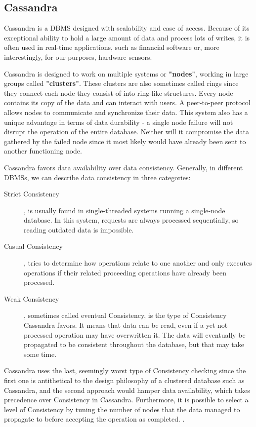\subsection{Cassandra}
\label{subsec:background:second_section:first_subsection}
\par Cassandra is a DBMS designed with scalability and ease of access. Because of its exceptional ability to hold a large amount of data and process lots of writes, it is often used in real-time applications, such as financial software or, more interestingly, for our purposes, hardware sensors\citep{CassandraUseCase}. 
\par Cassandra is designed to work on multiple systems or \textbf{"nodes"}, working in large groups called \textbf{"clusters"}. These clusters are also sometimes called rings since they connect each node they consist of into ring-like structures. Every node contains its copy of the data and can interact with users. A peer-to-peer protocol allows nodes to communicate and synchronize their data. This system also has a unique advantage in terms of data durability - a single node failure will not disrupt the operation of the entire database. Neither will it compromise the data gathered by the failed node since it most likely would have already been sent to another functioning node\citep{HewittCassandra}.
\par Cassandra favors data availability over data consistency. Generally, in different DBMSs, we can describe data consistency in three categories:
\begin{description}
  \item [Strict Consistency], is usually found in single-threaded systems running a single-node database. In this system, requests are always processed sequentially, so reading outdated data is impossible.
  \item [Casual Consistency], tries to determine how operations relate to one another and only executes operations if their related proceeding operations have already been processed.
  \item [Weak Consistency], sometimes called eventual Consistency, is the type of Consistency Cassandra favors. It means that data can be read, even if a yet not processed operation may have overwritten it. The data will eventually be propagated to be consistent throughout the database, but that may take some time. 
\end{description}
\par Cassandra uses the last, seemingly worst type of Consistency checking since the first one is antithetical to the design philosophy of a clustered database such as Cassandra, and the second approach would hamper data availability, which takes precedence over Consistency in Cassandra. Furthermore, it is possible to select a level of Consistency by tuning the number of nodes that the data managed to propagate to before accepting the operation as completed. \citep{HewittCassandra}.
